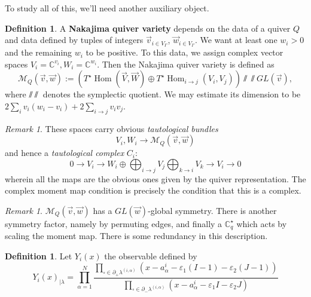 \documentclass[leqno, openany]{memoir}
\theoremstyle{definition}
\newtheorem{defn}[thm]{Definition}
\theoremstyle{remark}
\newtheorem{rmk}[thm]{Remark}
\theoremstyle{plain}
\theoremstyle{definition}
\theoremstyle{remark}
\newcommand{\ep}{\varepsilon}
\DeclareMathOperator{\Hom}{Hom}
\begin{document}
To study all of this, we'll need another auxiliary object.
\begin{defn}
  A \textbf{Nakajima quiver variety} depends on the data of a quiver $Q$ and data defined by tuples of integers $\vec{v}_{i \in V_\Gamma}$, $\vec{w}_{i \in V_\Gamma}$. 
  We want at least one $w_i > 0$ and the remaining $w_i$ to be positive. 
  To this data, we assign complex vector spaces $V_i = \mathbb{C}^{v_i}, W_i = \mathbb{C}^{w_i}$. 
  Then the Nakajima quiver variety is defined as
  \[
\mathcal{M}_Q(\vec{v},\vec{w}) := (T^\star \Hom(\vec{V},\vec{W}) \oplus T^\star \Hom_{i \to j}(V_i,V_j))\sslash\!\!\!\sslash GL(\vec{v}),
  \]
  where $\sslash\!\!\sslash$ denotes the symplectic quotient. 
  We may estimate its dimension to be $2 \sum_i v_i(w_i - v_i) + 2 \sum_{i \to j} v_i v_j$.
\end{defn}

\begin{rmk}
These spaces carry obvious \emph{tautological bundles} 
\[
V_i, W_i \to \mathcal{M}_Q(\vec{v},\vec{w})
\]
and hence a \emph{tautological complex} $C_i$:
\[
0 \to V_i \to W_i \oplus \bigoplus_{i \to j} V_j \bigoplus_{k \to i} V_k \to V_i \to 0
\]
wherein all the maps are the obvious ones given by the quiver representation. 
The complex moment map condition is precisely the condition that this is a complex.
\end{rmk}

\begin{rmk}
$\mathcal{M}_Q(\vec{v},\vec{w})$ has a $GL(\vec{w})$-global symmetry. 
There is another symmetry factor, namely by permuting edges, and finally a $\mathbb{C}^\star_q$ which
acts by scaling the moment map.
There is some redundancy in this description.
\end{rmk}

\begin{defn}
Let $Y_i(x)$ the observable defined by 
\[
Y_i(x)_{|\lambda} = \prod_{\alpha = 1}^N \frac{\prod_{\square \in \partial_+ \lambda^{(i,\alpha)}}(x - a_\alpha^i - \ep_1(I- 1) - \ep_2(J-1))}{\prod_{\square \in \partial_- \lambda^{(i,\alpha)}}(x - a_\alpha^i - \ep_1 I - \ep_2 J)}
\]
\end{defn} 
\end{document}
